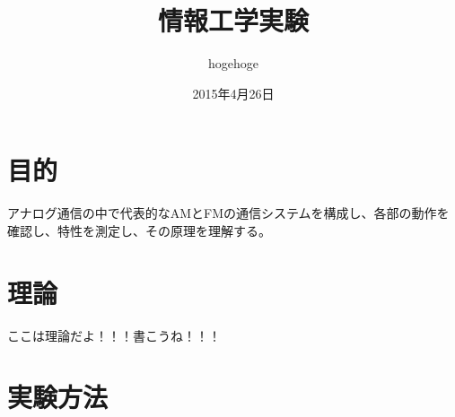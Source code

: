 \documentclass{jsarticle}
\begin{document}
\title{情報工学実験}
\author{hogehoge}
\date{2015年4月26日}
\maketitle

\section{目的}

アナログ通信の中で代表的なAMとFMの通信システムを構成し、各部の動作を確認し、特性を測定し、その原理を理解する。

\section{理論}

ここは理論だよ！！！書こうね！！！

\section{実験方法}
\end{document}
